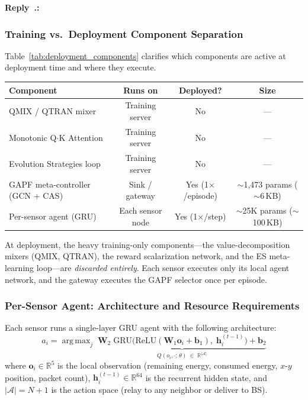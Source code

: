 \documentclass[11pt]{article}
\newcounter{reviewer}
\newcounter{replyctr}[reviewer]
\renewcommand{\thereplyctr}{\thereviewer.\arabic{replyctr}}
\newenvironment{reply}
  {\refstepcounter{replyctr}%
   \addtocounter{replyctr}{-1}%
   \medskip\noindent
   \begin{sf}\textbf{Reply~\thereplyctr:}\ }
  {\addtocounter{replyctr}{1}%
   \medskip\end{sf}}
\DeclareMathOperator*{\argmax}{arg\,max}
\begin{document}
\begin{refsection}
\begin{mdframed}[style=Resp]
\begin{reply}
\subsubsection{Training vs.\ Deployment Component Separation}

Table~\ref{tab:deployment_components} clarifies which components are active at
deployment time and where they execute.

\begin{center}
\label{tab:deployment_components}
\renewcommand{\arraystretch}{1.15}
\begin{tabular}{@{}lccc@{}}
\toprule
\textbf{Component} & \textbf{Runs on} & \textbf{Deployed?} & \textbf{Size} \\
\midrule
QMIX / QTRAN mixer         & Training server  & No  & ---          \\
Monotonic Q$\cdot$K Attention & Training server & No  & ---          \\
Evolution Strategies loop   & Training server  & No  & ---          \\
\midrule
GAPF meta-controller (GCN + CAS) & Sink / gateway & Yes (1$\times$/episode) & $\sim$1{,}473 params ($\sim$6\,KB) \\
Per-sensor agent (GRU)      & Each sensor node & Yes (1$\times$/step)    & $\sim$25K params ($\sim$100\,KB) \\
\bottomrule
\end{tabular}
\end{center}

At deployment, the heavy training-only components---the value-decomposition
mixers (QMIX, QTRAN), the reward scalarization network, and the ES
meta-learning loop---are \emph{discarded entirely}. Each sensor executes only
its local agent network, and the gateway executes the GAPF selector once per
episode.

\subsubsection{Per-Sensor Agent: Architecture and Resource Requirements}

Each sensor runs a single-layer GRU agent with the following architecture:
\begin{equation}
    a_i = \argmax_{j}\; \underbrace{
        \mathbf{W}_2 \;\mathrm{GRU}\!\bigl(\mathrm{ReLU}(\mathbf{W}_1 \mathbf{o}_i + \mathbf{b}_1),\; \mathbf{h}_{i}^{(t-1)}\bigr) + \mathbf{b}_2
    }_{Q(o_i, \cdot;\, \theta) \;\in\; \mathbb{R}^{|\mathcal{A}|}}
    \label{eq:agent_forward}
\end{equation}
where $\mathbf{o}_i \in \mathbb{R}^5$ is the local observation (remaining energy,
consumed energy, $x$-$y$ position, packet count), $\mathbf{h}_i^{(t-1)} \in
\mathbb{R}^{64}$ is the recurrent hidden state, and $|\mathcal{A}| = N+1$ is the
action space (relay to any neighbor or deliver to BS).


\end{reply}
\end{mdframed}
\end{refsection}
\end{document}
